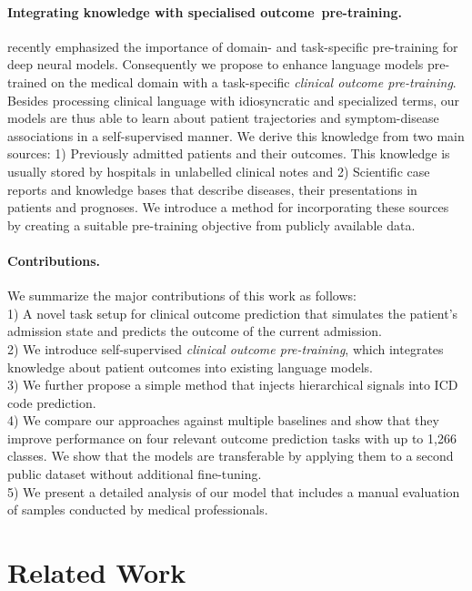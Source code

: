 \documentclass[11pt,a4paper]{article}
\begin{document}
\paragraph{Integrating knowledge with specialised \hbox{outcome pre-training}.} \citet{pretraining} recently emphasized the importance of domain- and task-specific pre-training for deep neural models. Consequently we propose to enhance language models pre-trained on the medical domain with a task-specific \textit{clinical outcome pre-training}. Besides processing clinical language with idiosyncratic and specialized terms, our models are thus able to learn about patient trajectories and symptom-disease associations in a self-supervised manner. We derive this knowledge from two main sources: 1) Previously admitted patients and their outcomes. This knowledge is usually stored by hospitals in unlabelled clinical notes and 2) Scientific case reports and knowledge bases that describe diseases, their presentations in patients and prognoses. We introduce a method for incorporating these sources by creating a suitable pre-training objective from publicly available data.

\paragraph{Contributions.} We summarize the major contributions of this work as follows:\\
1) A novel task setup for clinical outcome prediction that simulates the patient's admission state and predicts the outcome of the current admission.\\
2) We introduce self-supervised \textit{clinical outcome pre-training}, which integrates knowledge about patient outcomes into existing language models.\\
3) We further propose a simple method that injects hierarchical signals into ICD code prediction.\\
4) We compare our approaches against multiple baselines and show that they improve performance on four relevant outcome prediction tasks with up to 1,266 classes. We show that the models are transferable by applying them to a second public dataset without additional fine-tuning.\\
5) We present a detailed analysis of our model that includes a manual evaluation of samples conducted by medical professionals. \section{Related Work}
\end{document}
